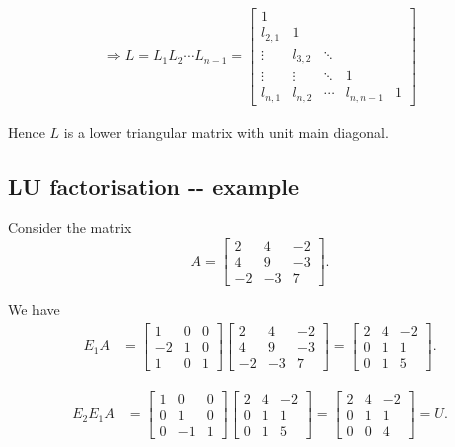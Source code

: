 \documentclass[11pt]{article}
\begin{document}
    \[\begin{aligned}
\Longrightarrow L = L_1 L_2 \cdots L_{n-1} = \left[\begin{array}{cccccc}
1&   &  &   &   \\
l_{2,1} & 1 &    & &\\
\vdots & l_{3,2} & \ddots &\\
\vdots       & \vdots      &    \ddots    &   1 &  \\
l_{n,1} & l_{n,2} & \cdots & l_{n,n-1} & 1
\end{array}\right]\end{aligned}\]

Hence \(L\) is a lower triangular matrix with unit main diagonal.

    \subsection{LU factorisation -\/-
example}\label{lu-factorisation----example}

Consider the matrix
\[A = \left[\begin{array}{rrr}2&4&-2\\4&9&-3\\-2&-3&7\end{array}\right].\]

We have \[\begin{aligned}
E_1 A &=\left[\begin{array}{rrr}
1&0&0\\
{-2} & 1 & 0\\
{1} &  0 & 1
\end{array} \right] \left[\begin{array}{rrr}2&4&-2\\4&9&-3\\-2&-3&7\end{array}
\right]=\left[\begin{array}{rrr}2&4&-2\\0&1&1\\0&1&5\end{array}
\right].\end{aligned}\]

\[\begin{aligned}
E_2 E_1 A&=\left[\begin{array}{rrr}
1 & 0 & 0\\
0 & 1 & 0\\
0 &{-1} & 1
\end{array} \right]\left[\begin{array}{rrr}2&4&-2\\0&1&1\\0&1&5\end{array}
\right]=\left[\begin{array}{rrr}2&4&-2\\0&1&1\\0&0&4\end{array}
\right] = U.\end{aligned}\]
\end{document}
